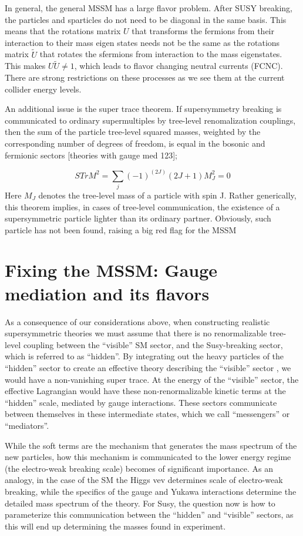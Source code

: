In general, the general MSSM has a large flavor problem. After SUSY breaking, the particles and sparticles do not need to be diagonal in the same basis. This means that the rotations matrix $U$ that transforms the fermions from their interaction to their mass eigen states needs not be the same as the rotations matrix $\tilde{U}$ that rotates the sfermions from interaction to the mass eigenstates. This makes $U\tilde{U} \neq 1$, which leads to flavor changing neutral currents (FCNC). There are strong restrictions on these processes as we see them at the current collider energy levels. 

An additional issue is the super trace theorem. If supersymmetry breaking is communicated to ordinary supermultiples by tree-level renomalization couplings, then the sum of the particle tree-level squared masses, weighted by the corresponding number of degrees of freedom, is equal in the bosonic and fermionic sectors [theories with gauge med 123];

\begin{equation*}
    STrM^2 = \sum_j(-1)^(2J)(2J+1)M_J^2 = 0
\end{equation*}
Here $M_J$  denotes the tree-level mass of a particle with spin J. Rather generically, this theorem implies, in cases of tree-level communication, the existence of a supersymmetric particle lighter than its ordinary partner. Obviously, such particle has not been found, raising a big red flag for the MSSM

\section{Fixing the MSSM: Gauge mediation and its flavors}
 As a consequence of our considerations above, when constructing realistic supersymmetric theories we must assume that there is no renormalizable tree-level coupling between the “visible” SM sector, and the Susy-breaking sector, which is referred to as “hidden”.  By integrating out the heavy particles of the “hidden” sector to create an effective theory describing the “visible” sector , we would have a non-vanishing super trace. At the energy of the “visible” sector, the effective Lagrangian would have  these non-renormalizable kinetic terms at the “hidden” scale, mediated by gauge interactions.  These sectors communicate between themselves in these intermediate states, which we call “messengers” or “mediators”.

While the soft terms are the mechanism that generates the mass spectrum of the new particles, how this mechanism is communicated to the lower energy regime (the electro-weak breaking scale) becomes of significant importance. As an analogy, in the case of the SM the Higgs vev determines scale of electro-weak breaking, while the specifics of the gauge and Yukawa interactions determine the detailed mass spectrum of the theory. For Susy, the question now is how to parameterize this communication between the “hidden” and “visible” sectors, as this will end up determining the masses found in experiment. 


